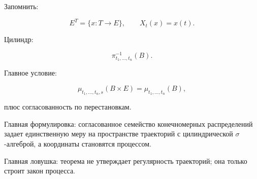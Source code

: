 \documentclass[
  11pt,
  a4paper,
]{article}
\begin{document}
Запомнить:

\[
E^T=\{x:T\to E\},
\qquad
X_t(x)=x(t).
\]

Цилиндр:

\[
\pi_{t_1,\ldots,t_n}^{-1}(B).
\]

Главное условие:

\[
\mu_{t_1,\ldots,t_n,s}(B\times E)
=
\mu_{t_1,\ldots,t_n}(B),
\]

плюс согласованность по перестановкам.

Главная формулировка: согласованное семейство конечномерных
распределений задает единственную меру на пространстве траекторий с
цилиндрической \(\sigma\)-алгеброй, а координаты становятся процессом.

Главная ловушка: теорема не утверждает регулярность траекторий; она
только строит закон процесса.

\newpage
\end{document}
